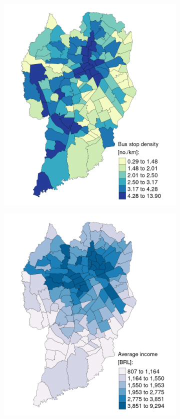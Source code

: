 \begin{figure}[!htbp]
    \centering\footnotesize
    \captionsetup{font=footnotesize}
    \caption{BSD AND AVI}
    \begin{subfigure}{0.5\textwidth}
        \includegraphics{fig/map_BSD.png}
    \end{subfigure}%
    \begin{subfigure}{0.5\textwidth}
        \includegraphics{fig/map_AVI.png}

\end{subfigure}
\end{figure}
